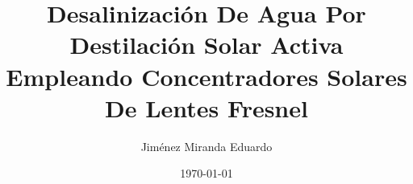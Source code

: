 





\makeatletter                       
	\def\printauthor{\@author}
	\def\printdate{\@date}
	\def\printtitle{\@title}
\makeatother

\providecommand{\keywords}[2][Palabras clave]{
  \small	
  \textbf{\textit{#1 ---}} #2
}




\title{Desalinización De Agua Por Destilación Solar Activa Empleando Concentradores Solares De Lentes Fresnel}
\date{\today}
\author{Jiménez Miranda Eduardo}

